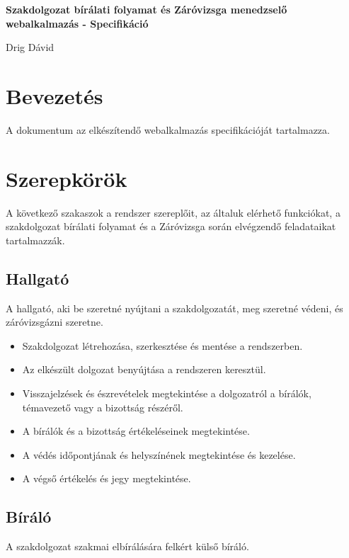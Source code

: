 \documentclass[a4paper,12pt]{article}
\begin{document}
\begin{center}
	{\Large \textbf{Szakdolgozat bírálati folyamat és Záróvizsga menedzselő webalkalmazás - Specifikáció}}

	\bigskip
	
	{\large Drig Dávid}
\end{center}

\tableofcontents

\section{Bevezetés}

A dokumentum az elkészítendő webalkalmazás specifikációját tartalmazza.

\section{Szerepkörök}

A következő szakaszok a rendszer szereplőit, az általuk elérhető funkciókat, a szakdolgozat bírálati folyamat és a Záróvizsga során elvégzendő feladataikat tartalmazzák.

\subsection{Hallgató}

A hallgató, aki be szeretné nyújtani a szakdolgozatát, meg szeretné védeni, és záróvizsgázni szeretne.

\begin{itemize}
\item Szakdolgozat létrehozása, szerkesztése és mentése a rendszerben.
\item Az elkészült dolgozat benyújtása a rendszeren keresztül.
\item Visszajelzések és észrevételek megtekintése a dolgozatról a bírálók, témavezető vagy a bizottság részéről.
\item A bírálók és a bizottság értékeléseinek megtekintése.
\item A védés időpontjának és helyszínének megtekintése és kezelése.
\item A végső értékelés és jegy megtekintése.
\end{itemize}

\subsection{Bíráló}

A szakdolgozat szakmai elbírálására felkért külső bíráló.
\end{document}
